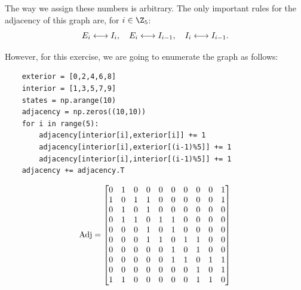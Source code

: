 \begin{center}
    
\end{center}

The way we assign these numbers is arbitrary. The only important rules for the adjacency of this graph are, for $i \in \Z_5$:
\[ E_i \longleftrightarrow I_i,\hspace*{1em} E_i \longleftrightarrow I_{i-1},\hspace*{1em} I_i\longleftrightarrow I_{i-1}.   \]

However, for this exercise, we are going to enumerate the graph as follows:

\begin{center}
    
\end{center}

\begin{verbatim}
    exterior = [0,2,4,6,8]
    interior = [1,3,5,7,9]
    states = np.arange(10)
    adjacency = np.zeros((10,10))
    for i in range(5):
        adjacency[interior[i],exterior[i]] += 1
        adjacency[interior[i],exterior[(i-1)%5]] += 1
        adjacency[interior[i],interior[(i-1)%5]] += 1
    adjacency += adjacency.T
\end{verbatim}
\[ \hbox{Adj} = \left[\begin{matrix}0 & 1 & 0 & 0 & 0 & 0 & 0 & 0 & 0 & 1\\1 & 0 & 1 & 1 & 0 & 0 & 0 & 0 & 0 & 1\\0 & 1 & 0 & 1 & 0 & 0 & 0 & 0 & 0 & 0\\0 & 1 & 1 & 0 & 1 & 1 & 0 & 0 & 0 & 0\\0 & 0 & 0 & 1 & 0 & 1 & 0 & 0 & 0 & 0\\0 & 0 & 0 & 1 & 1 & 0 & 1 & 1 & 0 & 0\\0 & 0 & 0 & 0 & 0 & 1 & 0 & 1 & 0 & 0\\0 & 0 & 0 & 0 & 0 & 1 & 1 & 0 & 1 & 1\\0 & 0 & 0 & 0 & 0 & 0 & 0 & 1 & 0 & 1\\1 & 1 & 0 & 0 & 0 & 0 & 0 & 1 & 1 & 0\end{matrix}\right] \]

